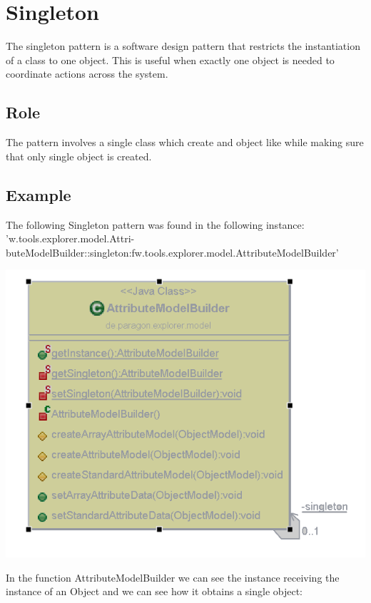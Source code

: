\section{Singleton}

The singleton pattern is a software design pattern that restricts the instantiation of a class to one object. This is useful when exactly one object is needed to coordinate actions across the system.

\subsection*{Role}
The pattern involves a single class which create and object like while making sure that only single object is created.

\subsection*{Example}

The following Singleton pattern was found in the following instance: 'w.tools.explorer.model.Attri-
buteModelBuilder::singleton:fw.tools.explorer.model.AttributeModelBuilder'

\begin{center}
\includegraphics{images/Singleton.png}
\end{center}


In the function AttributeModelBuilder we can see the instance receiving the instance of an Object and we can see how it obtains a single object:


